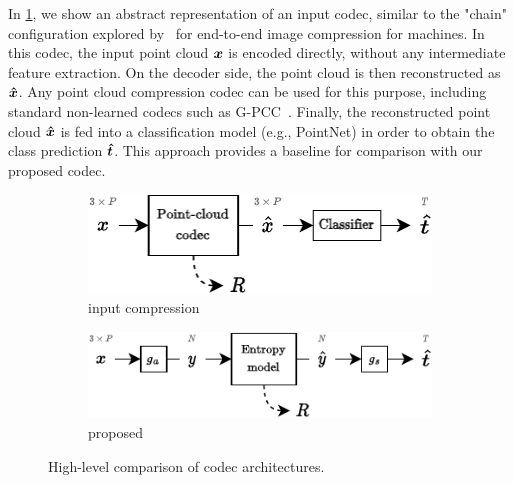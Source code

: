 In \cref{fig:arch-comparison/input-compression}, we show an abstract representation of an input codec, similar to the "chain" configuration explored by~\cite{chamain2020endtoend} for end-to-end image compression for machines.
In this codec, the input point cloud ${\boldsymbol{x}}$ is encoded directly, without any intermediate feature extraction.
On the decoder side, the point cloud is then reconstructed as ${\boldsymbol{\hat{x}}}$.
Any point cloud compression codec can be used for this purpose, including standard non-learned codecs such as G-PCC~\cite{mpeg2019gpccv2}.
Finally, the reconstructed point cloud ${\boldsymbol{\hat{x}}}$ is fed into a classification model (e.g., PointNet) in order to obtain the class prediction ${\boldsymbol{\hat{t}}}$.
This approach provides a baseline for comparison with our proposed codec.

\begin{figure}[tbp]
  \centering
  \begin{subfigure}[b]{0.68\linewidth}
    \centering
    \includegraphics[width=\linewidth]{img/point_cloud_compression/arch/input-compression.pdf}
    \caption{input compression}
    \label{fig:arch-comparison/input-compression}
  \end{subfigure}%
  \vspace{1.5\baselineskip}
  \begin{subfigure}[b]{0.8\linewidth}
    \centering
    \includegraphics[width=\linewidth]{img/point_cloud_compression/arch/proposed.pdf}
    \caption{proposed}
    \label{fig:arch-comparison/proposed}
  \end{subfigure}%
  \caption{High-level comparison of codec architectures.}
  \label{fig:arch-comparison}
\end{figure}



